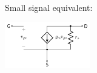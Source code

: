 \documentclass[10pt]{article}
\begin{document}
\begin{multicols*}{3}
\newcolumn
Small signal equivalent:

\begin{center}
    \includegraphics[width=10em]{images/mosfet_hybrid_pi.png} 
\end{center}

\end{multicols*}
\end{document}
